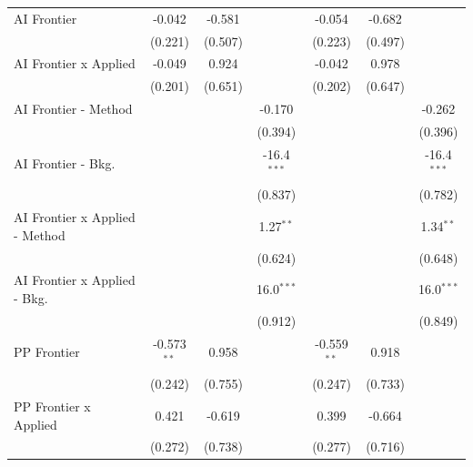 \begin{tabular}{lcccccc}
   AI Frontier                    & -0.042        & -0.581      &               & -0.054        & -0.682      &   \\   
                                  & (0.221)       & (0.507)     &               & (0.223)       & (0.497)     &   \\   
   AI Frontier x Applied          & -0.049        & 0.924       &               & -0.042        & 0.978       &   \\   
                                  & (0.201)       & (0.651)     &               & (0.202)       & (0.647)     &   \\   
   AI Frontier - Method           &               &             & -0.170        &               &             & -0.262\\   
                                  &               &             & (0.394)       &               &             & (0.396)\\   
   AI Frontier - Bkg.             &               &             & -16.4$^{***}$ &               &             & -16.4$^{***}$\\   
                                  &               &             & (0.837)       &               &             & (0.782)\\   
   AI Frontier x Applied - Method &               &             & 1.27$^{**}$   &               &             & 1.34$^{**}$\\   
                                  &               &             & (0.624)       &               &             & (0.648)\\   
   AI Frontier x Applied - Bkg.   &               &             & 16.0$^{***}$  &               &             & 16.0$^{***}$\\   
                                  &               &             & (0.912)       &               &             & (0.849)\\   
   PP Frontier                    & -0.573$^{**}$ & 0.958       &               & -0.559$^{**}$ & 0.918       &   \\   
                                  & (0.242)       & (0.755)     &               & (0.247)       & (0.733)     &   \\   
   PP Frontier x Applied          & 0.421         & -0.619      &               & 0.399         & -0.664      &   \\   
                                  & (0.272)       & (0.738)     &               & (0.277)       & (0.716)     &   \\   

\end{tabular}
